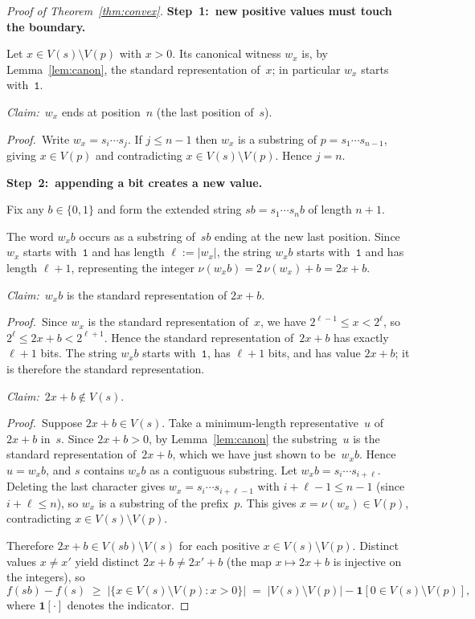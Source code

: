 ﻿\documentclass[11pt,a4paper]{article}
\theoremstyle{plain}
\theoremstyle{definition}
\theoremstyle{remark}
\newcommand{\val}{\nu}
\begin{document}
\begin{proof}[Proof of Theorem~\ref{thm:convex}]

\textbf{Step~1:\ new positive values must touch the boundary.}

Let $x\in V(s)\setminus V(p)$ with $x>0$.  Its canonical witness
$w_x$ is, by Lemma~\ref{lem:canon}, the standard representation
of~$x$; in particular $w_x$ starts with~$\mathtt{1}$.

\textit{Claim:}\ $w_x$ ends at position~$n$ (the last position
of~$s$).

\textit{Proof.}\ Write $w_x=s_i\cdots s_j$.  If $j\le n-1$ then
$w_x$ is a substring of $p=s_1\cdots s_{n-1}$, giving $x\in V(p)$
and contradicting $x\in V(s)\setminus V(p)$.  Hence $j=n$.

\medskip
\textbf{Step~2:\ appending a bit creates a new value.}

Fix any $b\in\{0,1\}$ and form the extended string
$sb=s_1\cdots s_n b$ of length $n+1$.

The word $w_x b$ occurs as a substring of~$sb$ ending at the new
last position.  Since $w_x$ starts with~$\mathtt{1}$ and has length
$\ell:=|w_x|$, the string $w_x b$ starts with~$\mathtt{1}$ and has
length $\ell+1$, representing the integer
$\val(w_x b)=2\,\val(w_x)+b=2x+b$.

\textit{Claim:}\ $w_x b$ is the standard representation of $2x+b$.

\textit{Proof.}\ Since $w_x$ is the standard representation of~$x$,
we have $2^{\ell-1}\le x<2^{\ell}$, so
$2^{\ell}\le 2x+b<2^{\ell+1}$.  Hence the standard representation
of~$2x+b$ has exactly $\ell+1$ bits.  The string $w_x b$ starts
with~$\mathtt{1}$, has $\ell+1$ bits, and has value $2x+b$; it is
therefore the standard representation.

\textit{Claim:}\ $2x+b\notin V(s)$.

\textit{Proof.}\ Suppose $2x+b\in V(s)$.  Take a minimum-length
representative~$u$ of~$2x+b$ in~$s$.  Since $2x+b>0$, by
Lemma~\ref{lem:canon} the substring~$u$ is the standard
representation of~$2x+b$, which we have just shown to be~$w_x b$.
Hence $u=w_x b$, and $s$ contains $w_x b$ as a contiguous
substring.  Let $w_x b=s_i\cdots s_{i+\ell}$.  Deleting the last
character gives $w_x=s_i\cdots s_{i+\ell-1}$ with
$i+\ell-1\le n-1$ (since $i+\ell\le n$), so $w_x$ is a
substring of the prefix~$p$.  This gives $x=\val(w_x)\in V(p)$,
contradicting $x\in V(s)\setminus V(p)$.

\smallskip
Therefore $2x+b\in V(sb)\setminus V(s)$ for each positive
$x\in V(s)\setminus V(p)$.  Distinct values $x\ne x'$ yield
distinct $2x+b\ne2x'+b$ (the map $x\mapsto 2x+b$ is injective on
the integers), so
\begin{equation}\label{eq:append-gain}
  f(sb)-f(s)
  \;\ge\;
  |\{x\in V(s)\setminus V(p):x>0\}|
  \;=\;
  |V(s)\setminus V(p)|-\mathbf{1}[0\in V(s)\setminus V(p)],
\end{equation}
where $\mathbf{1}[\cdot]$ denotes the indicator.


\end{proof}
\end{document}
